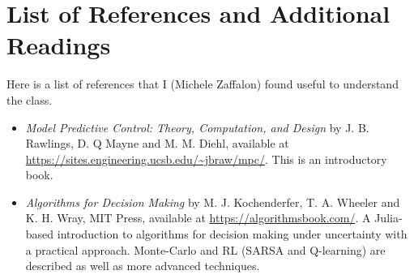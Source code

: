 \chapter*{List of References and Additional Readings}
\label{chap:references}

Here is a list of references that I (Michele Zaffalon) found useful to understand the class.
\begin{itemize}
\item \textit{Model Predictive Control: Theory, Computation, and Design} by J. B. Rawlings, D. Q Mayne and M. M. Diehl, available at \url{https://sites.engineering.ucsb.edu/~jbraw/mpc/}. This is an introductory book.
\item \textit{Algorithms for Decision Making} by M. J. Kochenderfer, T. A. Wheeler and K. H. Wray, MIT Press, available at \url{https://algorithmsbook.com/}. A Julia-based introduction to algorithms for decision making under uncertainty with a practical approach. Monte-Carlo and RL (SARSA and Q-learning) are described as well as more advanced techniques.
\end{itemize}


